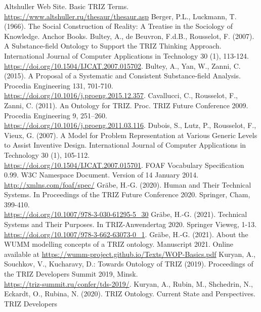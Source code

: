 \documentclass[12pt,a4paper]{article}
\begin{document}
\begin{thebibliography}{xxx}
 Altshuller Web Site. Basic TRIZ Terms.\\
  \url{https://www.altshuller.ru/thesaur/thesaur.asp}
 Berger, P.L., Luckmann, T. (1966). The Social Construction of
  Reality: A Treatise in the Sociology of Knowledge. Anchor Books.
 Bultey, A., de Beuvron, F.d.B., Rousselot, F. (2007). A
  Substance-field Ontology to Support the TRIZ Thinking Approach.
  International Journal of Computer Applications in Technology 30 (1),
  113-124.\\  \url{https://doi.org/10.1504/IJCAT.2007.015702}.
 Bultey, A., Yan, W., Zanni, C. (2015). A Proposal of a Systematic
  and Consistent Substance-field Analysis. Procedia Engineering 131,
  701-710. \\ \url{https://doi.org/10.1016/j.proeng.2015.12.357}.
 Cavallucci, C., Rousselot, F., Zanni, C. (2011). An Ontology for
  TRIZ.  Proc. TRIZ Future Conference 2009. Procedia Engineering 9,
  251–260.\\ \url{https://doi.org/10.1016/j.proeng.2011.03.116}.
 Dubois, S., Lutz, P., Rousselot, F., Vieux, G. (2007). A Model for
  Problem Representation at Various Generic Levels to Assist Inventive Design.
  International Journal of Computer Applications in Technology 30 (1),
  105-112.\\  \url{https://doi.org/10.1504/IJCAT.2007.015701}.
 FOAF Vocabulary Specification 0.99. W3C Namespace Document.
  Version of 14 January 2014. \url{http://xmlns.com/foaf/spec/}
 Gräbe, H.-G. (2020). Human and Their Technical Systems. In
  Proceedings of the TRIZ Future Conference 2020. Springer, Cham,
  399-410.\\ \url{https://doi.org/10.1007/978-3-030-61295-5_30}
 Gräbe, H.-G. (2021). Technical Systems and Their Purposes. In
  TRIZ-Anwendertag 2020. Springer Vieweg, 1-13.
  \url{https://doi.org/10.1007/978-3-662-63073-0_1}.
 Gräbe, H.-G. (2021). About the WUMM modelling concepts of a TRIZ
  ontology. Manuscript 2021. Online available at
  \url{https://wumm-project.github.io/Texts/WOP-Basics.pdf}
 Kuryan, A., Souchkov, V., Kucharavy, D.: Towards Ontology of
  TRIZ (2019). Proceedings of the TRIZ Developers Summit 2019, Minsk.\\
  \url{https://triz-summit.ru/confer/tds-2019/}. 
 Kuryan, A., Rubin, M., Shchedrin, N., Eckardt, O., Rubina, N.
  (2020).  TRIZ Onto\-logy. Current State and Perspectives. TRIZ Developers

\end{thebibliography}
\end{document}
